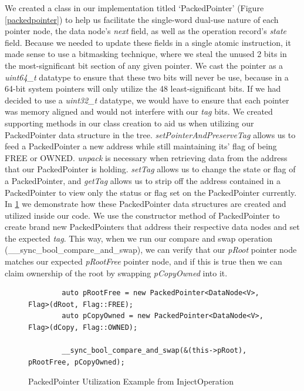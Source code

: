\documentclass[letterpaper, 10 pt, conference]{ieeeconf}
\begin{document}
	We created a class in our implementation titled `PackedPointer' (Figure \ref{packedpointer}) to help us facilitate the single-word dual-use nature of each pointer node, the data node's \textit{next} field, as well as the operation record's \textit{state} field. Because we needed to update these fields in a single atomic instruction, it made sense to use a bitmasking technique, where we steal the unused 2 bits in the most-significant bit section of any given pointer. We cast the pointer as a \textit{uint64\_t} datatype to ensure that these two bits will never be use, because in a 64-bit system pointers will only utilize the 48 least-significant bits. If we had decided to use a \textit{uint32\_t} datatype, we would have to ensure that each pointer was memory aligned and would not interfere with our \textit{tag} bits. We created supporting methods in our class creation to aid us when utilizing our PackedPointer data structure in the tree. \textit{setPointerAndPreserveTag} allows us to feed a PackedPointer a new address while still maintaining its' flag of being FREE or OWNED. \textit{unpack} is necessary when retrieving data from the address that our PackedPointer is holding. \textit{setTag} allows us to change the state or flag of a PackedPointer, and \textit{getTag} allows us to strip off the address contained in a PackedPointer to view only the status or flag set on the PackedPointer currently. In \ref{packedpointerexample} we demonstrate how these PackedPointer data structures are created and utilized inside our code. We use the constructor method of PackedPointer to create brand new PackedPointers that address their respective data nodes and set the expected \textit{tag}. This way, when we run our compare and swap operation (\_\_sync\_bool\_compare\_and\_swap), we can verify that our \textit{pRoot} pointer node matches our expected \textit{pRootFree} pointer node, and if this is true then we can claim ownership of the root by swapping \textit{pCopyOwned} into it.
	
	\begin{figure}
		\begin{lstlisting}
		auto pRootFree = new PackedPointer<DataNode<V>, Flag>(dRoot, Flag::FREE);
		auto pCopyOwned = new PackedPointer<DataNode<V>, Flag>(dCopy, Flag::OWNED);
		
		__sync_bool_compare_and_swap(&(this->pRoot), pRootFree, pCopyOwned);
		\end{lstlisting}
		\caption{PackedPointer Utilization Example from InjectOperation}
		\label{packedpointerexample}
	\end{figure}
\end{document}
